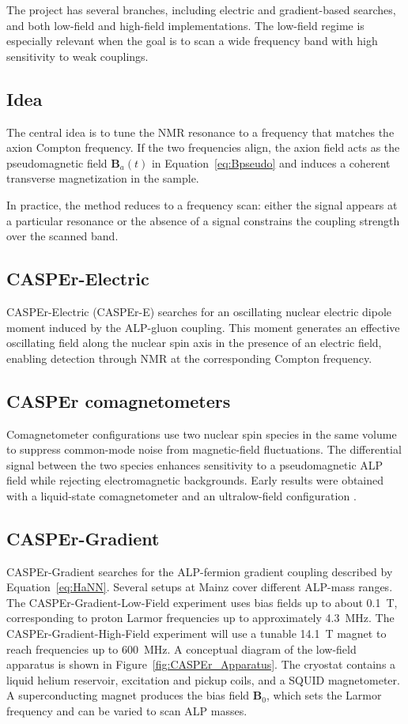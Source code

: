 The project has several branches, including electric and gradient-based searches, and both low-field and high-field implementations. The low-field regime is especially relevant when the goal is to scan a wide frequency band with high sensitivity to weak couplings.

\subsection{Idea}
The central idea is to tune the NMR resonance to a frequency that matches the axion Compton frequency. If the two frequencies align, the axion field acts as the pseudomagnetic field $\mathbf{B}_a(t)$ in Equation~\eqref{eq:Bpseudo} and induces a coherent transverse magnetization in the sample.

In practice, the method reduces to a frequency scan: either the signal appears at a particular resonance or the absence of a signal constrains the coupling strength over the scanned band.

\subsection{CASPEr-Electric}

CASPEr-Electric (CASPEr-E) searches for an oscillating nuclear electric dipole moment induced by the ALP-gluon coupling. This moment generates an effective oscillating field along the nuclear spin axis in the presence of an electric field, enabling detection through NMR at the corresponding Compton frequency.

\subsection{CASPEr comagnetometers}
Comagnetometer configurations use two nuclear spin species in the same volume to suppress common-mode noise from magnetic-field fluctuations. The differential signal between the two species enhances sensitivity to a pseudomagnetic ALP field while rejecting electromagnetic backgrounds. Early results were obtained with a liquid-state comagnetometer \cite{PhysRevLett.122.191302} and an ultralow-field configuration \cite{CASPEr_ZULF_2019}.

\subsection{CASPEr-Gradient}\label{sec:intro:CASPEr:gradient}
CASPEr-Gradient searches for the ALP-fermion gradient coupling described by Equation~\eqref{eq:HaNN}. Several setups at Mainz cover different ALP-mass ranges. The CASPEr-Gradient-Low-Field experiment uses bias fields up to about \SI{0.1}{\tesla}, corresponding to proton Larmor frequencies up to approximately \SI{4.3}{\MHz}. The CASPEr-Gradient-High-Field experiment will use a tunable \SI{14.1}{\tesla} magnet to reach frequencies up to \SI{600}{\MHz}. A conceptual diagram of the low-field apparatus is shown in Figure~\ref{fig:CASPEr_Apparatus}. The cryostat contains a liquid helium reservoir, excitation and pickup coils, and a SQUID magnetometer. A superconducting magnet produces the bias field $\mathbf{B}_0$, which sets the Larmor frequency and can be varied to scan ALP masses.

